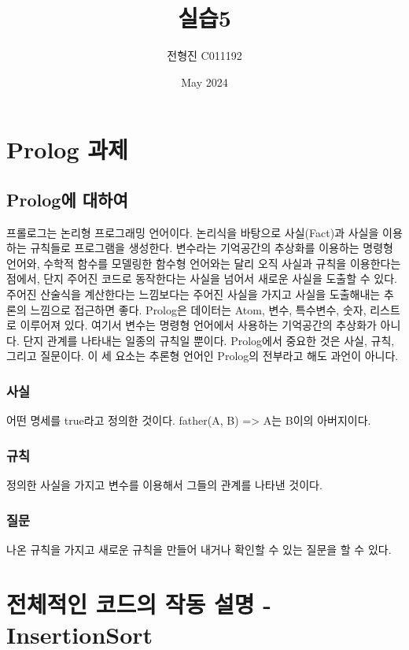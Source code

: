 \documentclass{article}
\title{실습5}
\author{전형진 C011192}
\date{May 2024}
\begin{document}
\maketitle

\section{Prolog 과제}

\subsection{Prolog에 대하여}
프롤로그는 논리형 프로그래밍 언어이다. 논리식을 바탕으로 사실(Fact)과 사실을 이용하는 규칙들로 프로그램을 생성한다. 변수라는 기억공간의 추상화를 이용하는 명령형 언어와, 수학적 함수를 모델링한 함수형 언어와는 달리 오직 사실과 규칙을 이용한다는 점에서, 단지 주어진 코드로 동작한다는 사실을 넘어서 새로운 사실을 도출할 수 있다. 주어진 산술식을 계산한다는 느낌보다는 주어진 사실을 가지고 사실을 도출해내는 추론의 느낌으로 접근하면 좋다.
Prolog은 데이터는 Atom, 변수, 특수변수, 숫자, 리스트로 이루어져 있다. 여기서 변수는 명령형 언어에서 사용하는 기억공간의 추상화가 아니다. 단지 관계를 나타내는 일종의 규칙일 뿐이다. Prolog에서 중요한 것은 사실, 규칙, 그리고 질문이다. 이 세 요소는 추론형 언어인 Prolog의 전부라고 해도 과언이 아니다. 
\subsubsection{사실}
어떤 명세를 true라고 정의한 것이다. father(A, B) => A는 B이의 아버지이다.
\subsubsection{규칙}
정의한 사실을 가지고 변수를 이용해서 그들의 관계를 나타낸 것이다.
\subsubsection{질문}
나온 규칙을 가지고 새로운 규칙을 만들어 내거나 확인할 수 있는 질문을 할 수 있다.

\newpage
\section{전체적인 코드의 작동 설명 - InsertionSort}
\end{document}
